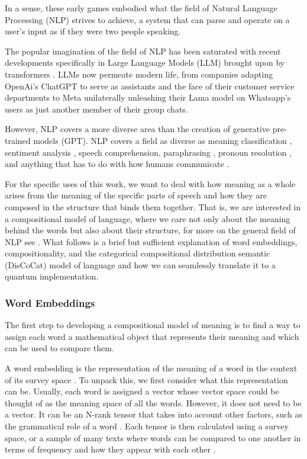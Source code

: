 In a sense, these early games embodied what the field of Natural Language Processing (NLP) strives to achieve, a system that can parse and operate on a user's input as if they were two people speaking.

The popular imagination of the field of NLP has been saturated with recent developments specifically in Large Language Models (LLM) brought upon by transformers \cite{chang_survey_2024}. LLMs now permeate modern life, from companies adapting OpenAi's ChatGPT to serve as assistants and the face of their customer service departments to Meta unilaterally unleashing their Lama model on Whatsapp's users as just another member of their group chats.

However, NLP covers a more diverse area than the creation of generative pre-trained models (GPT). NLP covers a field as diverse as meaning classification \cite{tsvetkov_evaluation_2015}, sentiment analysis \cite{schnabel_evaluation_2015}, speech comprehension, paraphrasing \cite{baumel_sentence_2016}, pronoun resolution \cite{wazni_quantum_2022}, and anything that has to do with how humans communicate \cite{chowdhary_natural_2020}.

For the specific uses of this work, we want to deal with how meaning as a whole arises from the meaning of the specific parts of speech and how they are composed in the structure that binds them together. That is, we are interested in a compositional model of language, where we care not only about the meaning behind the words but also about their structure, for more on the general field of NLP see \cite{klontzas_natural_2023,nadkarni_natural_2011}. What follows is a brief but sufficient explanation of word embeddings, compositionality, and the categorical compositional distribution semantic (DisCoCat) model of language and how we can seamlessly translate it to a quantum implementation.

\subsubsection{Word Embeddings} \label{sec:embeddings}
The first step to developing a compositional model of meaning is to find a way to assign each word a mathematical object that represents their meaning and which can be used to compare them.

A word embedding is the representation of the meaning of a word in the context of its survey space \cite{jiao_brief_2021}. To unpack this, we first consider what this representation can be. Usually, each word is assigned a vector whose vector space could be thought of as the meaning space of all the words. However, it does not need to be a vector. It can be an N-rank tensor that takes into account other factors, such as the grammatical role of a word \cite{kartsaklis_prior_2013,rahimi_tenssent_2021,rahimi_tens-embedding_2020}. Each tensor is then calculated using a survey space, or a sample of many texts where words can be compared to one another in terms of frequency and how they appear with each other \cite{bakarov_survey_2018}.

